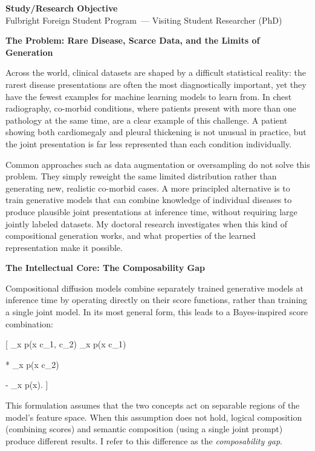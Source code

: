 \documentclass[12pt,a4paper]{article}
\begin{document}
\begin{center}
  {\large\textbf{Study/Research Objective}} \\[0.4em]
  {\normalsize Fulbright Foreign Student Program~--- Visiting Student Researcher (PhD)}
\end{center}

\vspace{0.5em}

\textbf{The Problem: Rare Disease, Scarce Data, and the Limits of Generation}

Across the world, clinical datasets are shaped by a difficult statistical reality: the rarest disease presentations are often the most diagnostically important, yet they have the fewest examples for machine learning models to learn from. In chest radiography, co-morbid conditions, where patients present with more than one pathology at the same time, are a clear example of this challenge. A patient showing both cardiomegaly and pleural thickening is not unusual in practice, but the joint presentation is far less represented than each condition individually.

Common approaches such as data augmentation or oversampling do not solve this problem. They simply reweight the same limited distribution rather than generating new, realistic co-morbid cases. A more principled alternative is to train generative models that can combine knowledge of individual diseases to produce plausible joint presentations at inference time, without requiring large jointly labeled datasets. My doctoral research investigates when this kind of compositional generation works, and what properties of the learned representation make it possible.

\textbf{The Intellectual Core: The Composability Gap}

Compositional diffusion models combine separately trained generative models at inference time by operating directly on their score functions, rather than training a single joint model. In its most general form, this leads to a Bayes-inspired score combination:

[
\nabla_x \log p(x \mid c_1, c_2)
\approx
\nabla_x \log p(x \mid c_1)

* \nabla_x \log p(x \mid c_2)

- \nabla_x \log p(x).
  ]

This formulation assumes that the two concepts act on separable regions of the model’s feature space. When this assumption does not hold, logical composition (combining scores) and semantic composition (using a single joint prompt) produce different results. I refer to this difference as the \textit{composability gap}.
\end{document}
